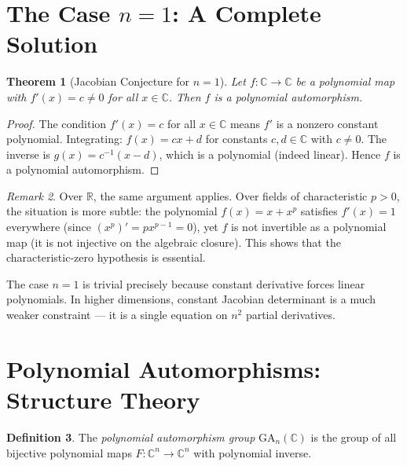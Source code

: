 \documentclass[12pt,a4paper]{amsart}
\newtheorem{theorem}{Theorem}[section]
\theoremstyle{definition}
\newtheorem{definition}[theorem]{Definition}
\theoremstyle{remark}
\newtheorem{remark}[theorem]{Remark}
\begin{document}
\section{The Case \texorpdfstring{$n=1$}{n=1}: A Complete Solution}
\label{sec:n1}

\begin{theorem}[Jacobian Conjecture for $n=1$]\label{thm:n1}
Let $f \colon \mathbb{C} \to \mathbb{C}$ be a polynomial map with $f'(x) = c \neq 0$
for all $x \in \mathbb{C}$. Then $f$ is a polynomial automorphism.
\end{theorem}

\begin{proof}
The condition $f'(x) = c$ for all $x \in \mathbb{C}$ means $f'$ is a nonzero
constant polynomial. Integrating: $f(x) = cx + d$ for constants $c,d \in \mathbb{C}$
with $c \neq 0$. The inverse is $g(x) = c^{-1}(x - d)$, which is a polynomial
(indeed linear). Hence $f$ is a polynomial automorphism.
\end{proof}

\begin{remark}
Over $\mathbb{R}$, the same argument applies. Over fields of characteristic $p > 0$,
the situation is more subtle: the polynomial $f(x) = x + x^p$ satisfies $f'(x) = 1$
everywhere (since $(x^p)' = px^{p-1} = 0$), yet $f$ is not invertible as a
polynomial map (it is not injective on the algebraic closure). This shows that the
characteristic-zero hypothesis is essential.
\end{remark}

The case $n=1$ is trivial precisely because constant derivative forces linear
polynomials. In higher dimensions, constant Jacobian determinant is a much
weaker constraint — it is a single equation on $n^2$ partial derivatives.

\section{Polynomial Automorphisms: Structure Theory}
\label{sec:struct}

\begin{definition}
The \emph{polynomial automorphism group} $\mathrm{GA}_n(\mathbb{C})$ is the group
of all bijective polynomial maps $F \colon \mathbb{C}^n \to \mathbb{C}^n$ with
polynomial inverse.
\end{definition}
\end{document}
